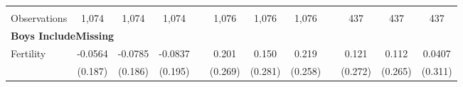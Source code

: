 \begin{landscape}
\begin{table}[htpb!]
\begin{center}
\begin{tabular}{lcccp{2mm}cccp{2mm}ccc}
\begin{footnotesize}\end{footnotesize}&\begin{footnotesize}\end{footnotesize}&\begin{footnotesize}\end{footnotesize}&\begin{footnotesize}\end{footnotesize}&\begin{footnotesize}\end{footnotesize}&\begin{footnotesize}\end{footnotesize}&\begin{footnotesize}\end{footnotesize}&\begin{footnotesize}\end{footnotesize}&\begin{footnotesize}\end{footnotesize}&\begin{footnotesize}\end{footnotesize}&\begin{footnotesize}\end{footnotesize}&\begin{footnotesize}\end{footnotesize}\\Observations&1,074&1,074&1,074&&1,076&1,076&1,076&&437&437&437\\
\multicolumn{12}{l}{\textbf{Boys IncludeMissing}}\\ 
Fertility&-0.0564&-0.0785&-0.0837&&0.201&0.150&0.219&&0.121&0.112&0.0407\\
&(0.187)&(0.186)&(0.195)&&(0.269)&(0.281)&(0.258)&&(0.272)&(0.265)&(0.311)\\

\end{tabular}
\end{center}
\end{table}
\end{landscape}
